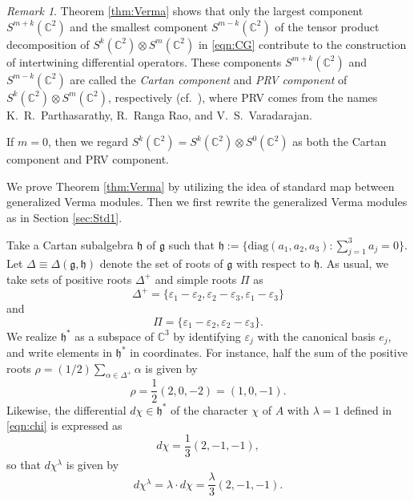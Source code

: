 \documentclass[reqno,11pt]{amsart}
\theoremstyle{remark}
\newtheorem{rem}[equation]{Remark}
\numberwithin{equation}{section}
\newcommand{\ga}{\alpha}
\newcommand{\gD}{\Delta}
\newcommand{\eps}{\varepsilon}
\newcommand{\fg}{{\mathfrak g}}
\newcommand{\fh}{{\mathfrak h}}
\newcommand{\C}{\mathbb{C}}
\newcommand{\diag}{\mathrm{diag}}
\begin{document}
\begin{rem}\label{rem:CPRV}
Theorem \ref{thm:Verma} shows that only the largest component
$S^{m+k}(\C^2)$ and the smallest component  $S^{m-k}(\C^2)$
of the tensor product decomposition of $S^k(\C^2)\otimes S^m(\C^2)$
in \eqref{eqn:CG} contribute to the construction of intertwining differential
operators. These components $S^{m+k}(\C^2)$ and $S^{m-k}(\C^2)$ 
are  called 
the \emph{Cartan component} and \emph{PRV component} of 
$S^k(\C^2)\otimes S^m(\C^2)$, respectively (cf.\ \cite{Kumar10}),
where PRV comes from the names 
K.\ R.\ Parthasarathy, R.\ Ranga Rao, and V.\ S.\ Varadarajan.

 If  $m=0$, then 
we regard $S^k(\C^2)=S^k(\C^2)\otimes S^0(\C^2)$  as both the Cartan component
and PRV component.
\end{rem}

We prove Theorem \ref{thm:Verma} by
utilizing the idea of standard map between generalized Verma modules. 
Then we first rewrite the generalized Verma modules as in Section \ref{sec:Std1}.

Take a Cartan subalgebra $\fh$ of $\fg$ such that $\fh:=\{\diag(a_1, a_2, a_3): 
\sum_{j=1}^3a_j=0\}$. Let $\gD\equiv \gD(\fg,\fh)$ 
denote the set of roots of $\fg$ with respect to $\fh$.
As usual, we take sets of positive roots $\gD^+$ and simple roots $\Pi$ as
\begin{equation*}
\gD^+=\{ \eps_1 - \eps_2, \eps_2 - \eps_3, \eps_1 - \eps_3\}
\end{equation*}
and
\begin{equation*}
\Pi = \{ \eps_1 - \eps_2, \eps_2 - \eps_3\}.
\end{equation*}
We realize $\fh^*$ as a subspace of $\C^{3}$ by identifying 
$\eps_j$ with the canonical basis $e_j$,
and write elements in $\fh^*$ in coordinates.
For instance, half the sum of the positive roots 
$\rho = (1/2)\sum_{\ga \in \gD^+}\ga$ is given by
\begin{equation*}
\rho = \frac{1}{2}(2, 0, -2)=(1,0,-1).
\end{equation*}
Likewise, the differential $d\chi \in \fh^*$ 
of the character $\chi$ of $A$  with $\lambda = 1$ defined in 
\eqref{eqn:chi} is expressed as
\begin{equation}\label{eqn:dchi}
d\chi= \frac{1}{3}(2, -1, -1),
\end{equation}
so that $d\chi^\lambda$ is given by
\begin{equation*}
d\chi^\lambda=\lambda \cdot d\chi =\frac{\lambda}{3}(2, -1, -1).
\end{equation*}
\end{document}
